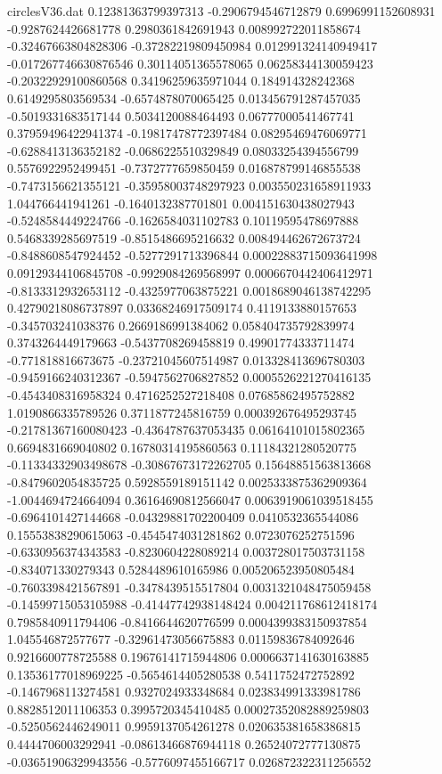 \begin{filecontents}{circlesV36.dat}
0.12381363799397313	-0.2906794546712879	0.6996991152608931
-0.9287624426681778	0.2980361842691943	0.008992722011858674
-0.32467663804828306	-0.37282219809450984	0.012991324140949417
-0.017267746630876546	0.30114051365578065	0.06258344130059423
-0.20322929100860568	0.34196259635971044	0.184914328242368
0.6149295803569534	-0.6574878070065425	0.013456791287457035
-0.5019331683517144	0.5034120088464493	0.06777000541467741
0.37959496422941374	-0.19817478772397484	0.08295469476069771
-0.6288413136352182	-0.0686225510329849	0.08033254394556799
0.5576922952499451	-0.7372777659850459	0.016878799146855538
-0.7473156621355121	-0.35958003748297923	0.003550231658911933
1.044766441941261	-0.1640132387701801	0.004151630438027943
-0.5248584449224766	-0.1626584031102783	0.10119595478697888
0.5468339285697519	-0.8515486695216632	0.008494462672673724
-0.8488608547924452	-0.5277291713396844	0.00022883715093641998
0.09129344106845708	-0.9929084269568997	0.0006670442406412971
-0.8133312932653112	-0.4325977063875221	0.0018689046138742295
0.42790218086737897	0.03368246917509174	0.4119133880157653
-0.345703241038376	0.2669186991384062	0.058404735792839974
0.3743264449179663	-0.5437708269458819	0.49901774333711474
-0.771818816673675	-0.23721045607514987	0.013328413696780303
-0.9459166240312367	-0.5947562706827852	0.0005526221270416135
-0.4543408316958324	0.4716252527218408	0.07685862495752882
1.0190866335789526	0.3711877245816759	0.000392676495293745
-0.21781367160080423	-0.4364787637053435	0.06164101015802365
0.6694831669040802	0.16780314195860563	0.11184321280520775
-0.11334332903498678	-0.30867673172262705	0.15648851563813668
-0.8479602054835725	0.5928559189151142	0.0025333875362909364
-1.0044694724664094	0.36164690812566047	0.0063919061039518455
-0.6964101427144668	-0.04329881702200409	0.0410532365544086
0.15553838290615063	-0.4545474031281862	0.0723076252751596
-0.6330956374343583	-0.8230604228089214	0.003728017503731158
-0.834071330279343	0.5284489610165986	0.005206523950805484
-0.7603398421567891	-0.3478439515517804	0.0031321048475059458
-0.14599715053105988	-0.41447742938148424	0.004211768612418174
0.7985840911794406	-0.8416644620776599	0.0004399383150937854
1.045546872577677	-0.32961473056675883	0.01159836784092646
0.9216600778725588	0.19676141715944806	0.0006637141630163885
0.13536177018969225	-0.5654614405280538	0.5411752472752892
-0.1467968113274581	0.9327024933348684	0.023834991333981786
0.8828512011106353	0.3995720345410485	0.00027352082889259803
-0.5250562446249011	0.9959137054261278	0.020635381658386815
0.4444706003292941	-0.08613466876944118	0.26524072777130875
-0.03651906329943556	-0.5776097455166717	0.026872322311256552

\end{filecontents}
